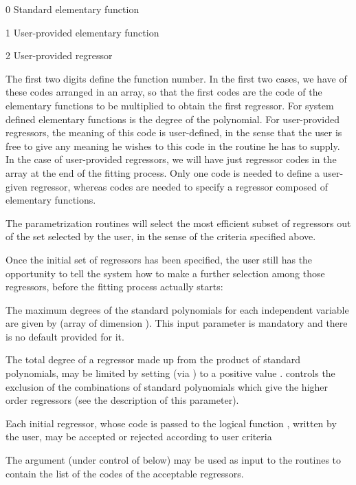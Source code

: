 \begin{DLtt}{12}
\item[0]  Standard elementary function
\item[1]  User-provided elementary function
\item[2]  User-provided regressor
\end{DLtt}
The first two digits define the function number.
In the first two cases, we have  of these codes arranged
in an array, so that the first  codes are the code of the
elementary functions to be multiplied to obtain the first regressor.
For system defined elementary
functions  is the degree of the polynomial.
For user-provided regressors,
the meaning of this code is user-defined, in the sense that the user is
free to give any meaning he wishes to this code in the routine he has to supply.
In the case of user-provided regressors, we will have just  regressor
codes in the array  at the end of the fitting process.
Only one code is needed to define a user-given regressor,
whereas  codes are
needed to specify a regressor composed of elementary functions.
 
The parametrization routines will select the most efficient subset of
regressors out of the set selected by the user, in the sense of the criteria
specified above.
 
Once the initial set of regressors has been specified, the user
still has the opportunity to tell the system how to make
a further selection among those
regressors, before the fitting process actually starts:
 
\begin{UL}
\item The maximum degrees of the standard polynomials for
each
independent variable are given by  (array of dimension
). This input parameter is mandatory and there is no default
provided for it.
\item The total degree of a regressor made up from the product of
standard
polynomials, may be limited by setting  (via )
to a positive value .  controls the exclusion
of the combinations of standard polynomials which give the higher order
regressors (see the description of this parameter).
\item Each initial regressor, whose code is passed to the logical
function , written by the user, may be accepted or rejected according to user criteria
\item The argument  (under control of  below) may
be used as input to the routines to contain the list of the codes of
the acceptable regressors.
\end{UL}
 
